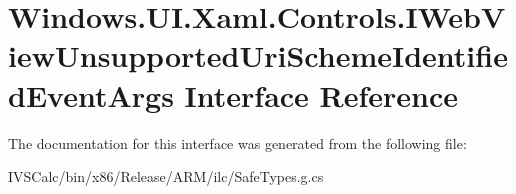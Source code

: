 \hypertarget{interface_windows_1_1_u_i_1_1_xaml_1_1_controls_1_1_i_web_view_unsupported_uri_scheme_identified_event_args}{}\section{Windows.\+U\+I.\+Xaml.\+Controls.\+I\+Web\+View\+Unsupported\+Uri\+Scheme\+Identified\+Event\+Args Interface Reference}
\label{interface_windows_1_1_u_i_1_1_xaml_1_1_controls_1_1_i_web_view_unsupported_uri_scheme_identified_event_args}


The documentation for this interface was generated from the following file\+:\begin{DoxyCompactItemize}
\item 
I\+V\+S\+Calc/bin/x86/\+Release/\+A\+R\+M/ilc/Safe\+Types.\+g.\+cs\end{DoxyCompactItemize}
